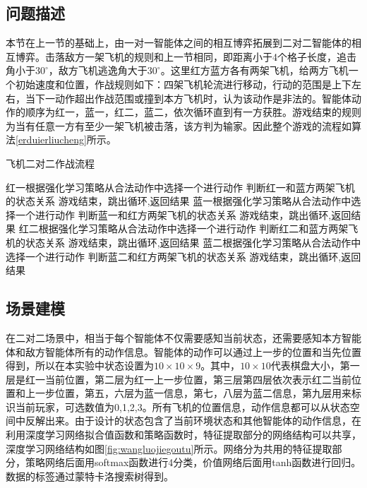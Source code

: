 \subsection{问题描述}
本节在上一节的基础上，由一对一智能体之间的相互博弈拓展到二对二智能体的相互博弈。击落敌方一架飞机的规则和上一节相同，即距离小于4个格子长度，追击角小于$30^\circ$，敌方飞机逃逸角大于$30^\circ$。这里红方蓝方各有两架飞机，给两方飞机一个初始速度和位置，作战规则如下：四架飞机轮流进行移动，行动的范围是上下左右，当下一动作超出作战范围或撞到本方飞机时，认为该动作是非法的。智能体动作的顺序为红一，蓝一，红二，蓝二，依次循环直到有一方获胜。游戏结束的规则为当有任意一方有至少一架飞机被击落，该方判为输家。因此整个游戏的流程如算法\ref{erduierliucheng}所示。
\begin{algorithm}[htbp]
	\caption{飞机二对二作战流程}%
	\label{erduierliucheng}
	\begin{algorithmic}[1]%
		\State 红一根据强化学习策略从合法动作中选择一个进行动作
		\State 判断红一和蓝方两架飞机的状态关系
		\State 游戏结束，跳出循环,返回结果
		\EndIf
		\State 蓝一根据强化学习策略从合法动作中选择一个进行动作
		\State 判断蓝一和红方两架飞机的状态关系
		\State 游戏结束，跳出循环,返回结果
		\EndIf
		\State 红二根据强化学习策略从合法动作中选择一个进行动作
		\State 判断红二和蓝方两架飞机的状态关系
		\State 游戏结束，跳出循环,返回结果
		\EndIf
		\State 蓝二根据强化学习策略从合法动作中选择一个进行动作
		\State 判断蓝二和红方两架飞机的状态关系
		\State 游戏结束，跳出循环,返回结果
		\EndIf
		\EndFor
	\end{algorithmic}
\end{algorithm}

\subsection{场景建模}

在二对二场景中，相当于每个智能体不仅需要感知当前状态，还需要感知本方智能体和敌方智能体所有的动作信息。智能体的动作可以通过上一步的位置和当先位置得到，所以在本实验中状态设置为$10 \times 10 \times 9$。其中，$10 \times 10$代表棋盘大小，第一层是红一当前位置，第二层为红一上一步位置，第三层第四层依次表示红二当前位置和上一步位置，第五，六层为蓝一信息，第七，八层为蓝二信息，第九层用来标识当前玩家，可选数值为0,1,2,3。所有飞机的位置信息，动作信息都可以从状态空间中反解出来。由于设计的状态包含了当前环境状态和其他智能体的动作信息，在利用深度学习网络拟合值函数和策略函数时，特征提取部分的网络结构可以共享，深度学习网络结构如图\ref{fig:wangluojiegoutu}所示。网络分为共用的特征提取部分，策略网络后面用softmax函数进行4分类，价值网络后面用tanh函数进行回归。数据的标签通过蒙特卡洛搜索树得到。

